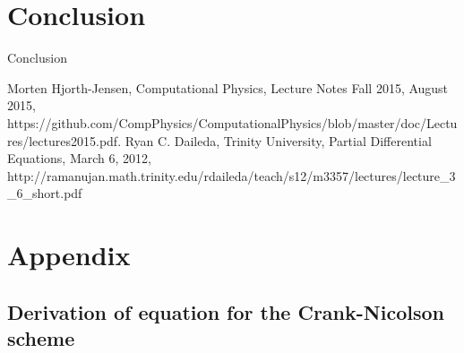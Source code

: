 \documentclass[reprint, english,notitlepage,nofootinbib]{revtex4-1}  %
\begin{document}
\section{Conclusion}

Conclusion


\onecolumngrid
\vspace{1cm} %

\begin{thebibliography}{}
 Morten Hjorth-Jensen, Computational Physics, Lecture Notes Fall 2015, August 2015, https://github.com/CompPhysics/ComputationalPhysics/blob/master/doc/Lectures/lectures2015.pdf.
 Ryan C. Daileda, Trinity University, Partial Differential Equations, March 6, 2012, http://ramanujan.math.trinity.edu/rdaileda/teach/s12/m3357/lectures/lecture\_3\_6\_short.pdf

\end{thebibliography}


\section{Appendix}

\subsection{Derivation of equation for the Crank-Nicolson scheme} \label{sect:Crank-Nicolson_derivation}
\end{document}
